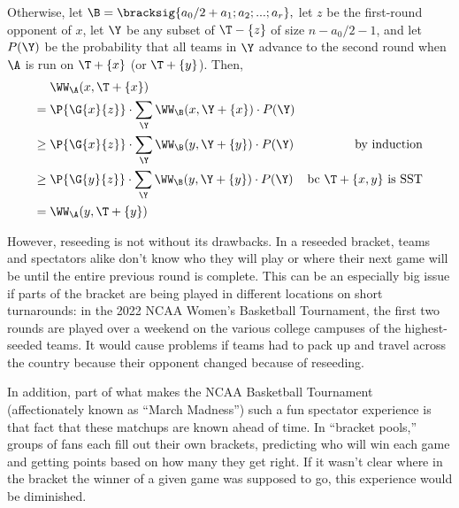 {{    Otherwise, let $\B = \bracksig{a_0 / 2 + a_1; a_2; ...; a_r},$ let $z$ be the first-round opponent of $x$, let $\Y$ be any subset of $\T - \{z\}$ of size $n - a_0/2 - 1$, and let $P(\Y)$ be the probability that all teams in $\Y$ advance to the second round when $\A$ is run on $\T + \{x\}$ (or $\T + \{y\}$). Then,
    \begin{align*}
        &\WW_\A(x, \T + \{x\})\\
        =\; &\P{\G{x}{z}} \cdot \sum_\Y \WW_\B(x, \Y + \{x\}) \cdot P(\Y)\\
        \geq\; &\P{\G{x}{z}} \cdot \sum_\Y \WW_\B(y, \Y + \{y\}) \cdot P(\Y) & \textrm {by induction}\\
        \geq\; &\P{\G{y}{z}} \cdot \sum_\Y \WW_\B(y, \Y + \{y\}) \cdot P(\Y) & \textrm {bc $\T + \{x, y\}$ is SST}\\
        =\; &\WW_\A(y, \T + \{y\})
    \end{align*}
}{}





However, reseeding is not without its drawbacks. In a reseeded bracket, teams and spectators alike don't know who they will play or where their next game will be until the entire previous round is complete. This can be an especially big issue if parts of the bracket are being played in different locations on short turnarounds: in the 2022 NCAA Women's Basketball Tournament, the first two rounds are played over a weekend on the various college campuses of the highest-seeded teams. It would cause problems if teams had to pack up and travel across the country because their opponent changed because of reseeding.

In addition, part of what makes the NCAA Basketball Tournament (affectionately known as ``March Madness'') such a fun spectator experience is that fact that these matchups are known ahead of time. In ``bracket pools,'' groups of fans each fill out their own brackets, predicting who will win each game and getting points based on how many they get right. If it wasn't clear where in the bracket the winner of a given game was supposed to go, this experience would be diminished.

}
